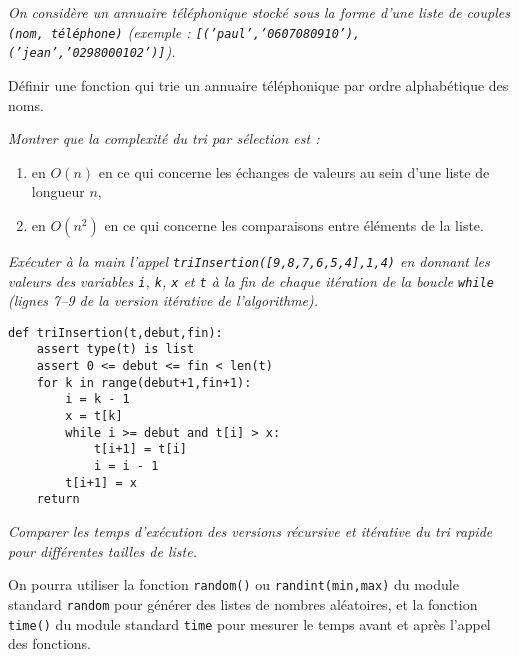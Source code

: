 \begin{td}\label{td:tri1}
\em
On considère un annuaire téléphonique stocké sous la forme d'une liste de couples
{\tt (nom, téléphone)} (exemple : {\tt [('paul','0607080910'),('jean','0298000102')]}).

Définir une fonction qui trie un annuaire téléphonique par ordre alphabétique des noms.
\end{td}

\begin{td}\label{td:tri2}
\em
Montrer que la complexité du tri par sélection est :
\begin{enumerate}
\item en $O(n)$ en ce qui concerne les échanges de valeurs au sein d'une liste
	de longueur $n$,
\item en $O(n^2)$ en ce qui concerne les comparaisons entre éléments de la liste.
\end{enumerate}
\end{td}

\begin{td}\label{td:tri3}
\em
Exécuter à la main l'appel {\tt triInsertion([9,8,7,6,5,4],1,4)} en donnant
les valeurs des variables {\tt i}, {\tt k}, {\tt x} et {\tt t} à la fin de chaque
itération de la boucle {\tt while} (lignes 7--9 de la version itérative de 
l'algorithme).

\begin{lstlisting}[title={\bf Tri par insertion}]
def triInsertion(t,debut,fin):
    assert type(t) is list
    assert 0 <= debut <= fin < len(t)
    for k in range(debut+1,fin+1):
        i = k - 1
        x = t[k]
        while i >= debut and t[i] > x:
            t[i+1] = t[i]
            i = i - 1
        t[i+1] = x
    return
\end{lstlisting}

\end{td}

\begin{td}\label{td:exectri1}
\em
Comparer les temps d'exécution des versions récursive et itérative du tri rapide pour
différentes tailles de liste.

On pourra utiliser la fonction {\tt random()} ou {\tt randint(min,max)} du module standard
{\tt random} pour générer des listes de nombres aléatoires, et la fonction {\tt time()}
du module standard {\tt time} pour mesurer le temps avant et après l'appel des
fonctions.
\end{td}

